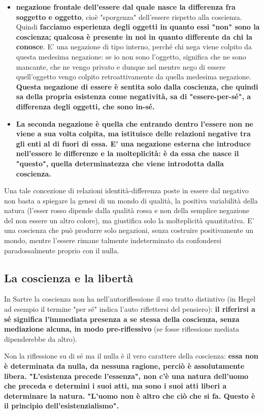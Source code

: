 \begin{itemize}
	\item \textbf{negazione frontale dell'essere dal quale
	nasce la differenza fra soggetto e oggetto},
	cioè "sporgenza" dell'essere rispetto alla
	coscienza. Quindi \textbf{facciamo esperienza degli
	oggetti in quanto essi "non" sono la coscienza;
	qualcosa è presente in noi in quanto differente
	da chi la conosce}. E' una negazione di tipo interno,
	perché chi nega viene colpito da questa medesima
	negazione: se io non sono l'oggetto, significa
	che ne sono mancante, che ne vengo privato
	e dunque nel mentre nego di essere quell'oggetto
	vengo colpito retroattivamente da quella
	medesima negazione. \textbf{Questa negazione di essere è sentita solo dalla coscienza, che quindi sa della propria esistenza come negatività, sa di "essere-per-sé", a differenza degli oggetti, che sono in-sé.}
	\item \textbf{La seconda negazione è quella che entrando
	dentro l'essere non ne viene a sua
	volta colpita, ma istituisce delle relazioni
	negative tra gli enti al di fuori di essa.
	E' una negazione esterna che introduce nell'essere le differenze e la molteplicità: è da
	essa che nasce il "questo", quella
	determinatezza che viene introdotta
	dalla coscienza.}
\end{itemize}

Una tale concezione di relazioni identità-differenza
poste in essere dal negativo non basta a spiegare
la genesi di un mondo di qualità, la positiva
variabilità della natura (l'esser rosso dipende
dalla qualità rossa e non della semplice negazione
del non essere un altro colore), ma giustifica
solo la molteplicità quantitativa. E' una coscienza
che può produrre solo negazioni, senza
costruire positivamente un mondo, mentre
l'essere rimane talmente indeterminato
da confondersi paradossalmente proprio con
il nulla.

\subsection{La coscienza e la libertà}

In Sartre la coscienza non ha nell'autoriflessione
il suo tratto distintivo (in Hegel ad esempio il termine
"per sé" indica l'auto riflettersi del pensiero): \textbf{il
riferirsi a sé significa l'immediata presenza a se
stessa della coscienza, senza mediazione alcuna, in modo
pre-riflessivo} (se fosse riflessione mediata dipenderebbe da altro).

Non la riflessione su di sé ma il nulla è il
vero carattere della coscienza: \textbf{essa non è determinata
da nulla, da nessuna ragione, perciò è assolutamente libera.
"L'esistenza precede l'essenza", non c'è una natura
dell'uomo che preceda e determini i suoi atti, ma
sono i suoi atti liberi a determinare la natura.
"L'uomo non è altro che ciò che si fa. Questo è
il principio dell'esistenzialismo".}

